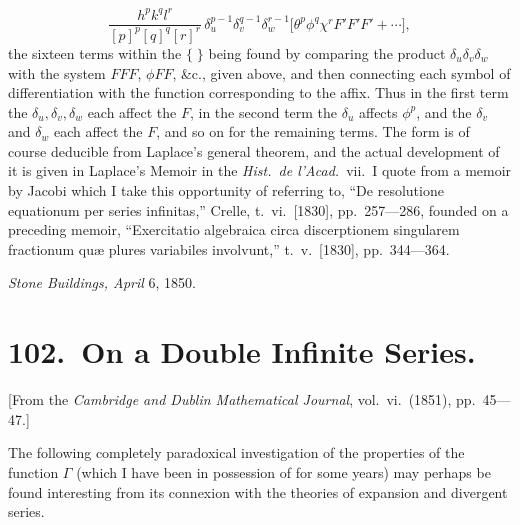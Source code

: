 \documentclass[11pt]{article}
\begin{document}
\[ \frac{h^p k^q l^r}{[p]^p[q]^q[r]^r}\,\delta_u^{p-1}\delta_v^{q-1}\delta_w^{r-1}\bigl[\theta^p\phi^q\chi^r F'F'F' + \cdots\bigr], \]
the sixteen terms within the $\{\;\}$ being found by comparing the product $\delta_u\delta_v\delta_w$ with the system $FFF$, $\phi FF$, \&c., given above, and then connecting each symbol of differentiation with the function corresponding to the affix. Thus in the first term the $\delta_u, \delta_v, \delta_w$ each affect the $F$, in the second term the $\delta_u$ affects $\phi^p$, and the $\delta_v$ and $\delta_w$ each affect the $F$, and so on for the remaining terms. The form is of course deducible from Laplace's general theorem, and the actual development of it is given in Laplace's Memoir in the \emph{Hist.\ de l'Acad.}\ vii.\ I quote from a memoir by Jacobi which I take this opportunity of referring to, ``De resolutione equationum per series infinitas,'' Crelle, t.\ vi.\ [1830], pp.\ 257---286, founded on a preceding memoir, ``Exercitatio algebraica circa discerptionem singularem fractionum qu\ae{} plures variabiles involvunt,'' t.\ v.\ [1830], pp.\ 344---364.

\bigskip
\hfill\emph{Stone Buildings, April} 6, 1850.
\clearpage


\section*{102.\ On a Double Infinite Series.}

\begin{center}\small
[From the \emph{Cambridge and Dublin Mathematical Journal}, vol.\ vi.\ (1851), pp.\ 45---47.]
\end{center}

The following completely paradoxical investigation of the properties of the function $\Gamma$ (which I have been in possession of for some years) may perhaps be found interesting from its connexion with the theories of expansion and divergent series.
\end{document}
